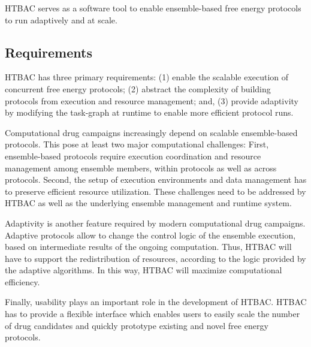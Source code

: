 HTBAC serves as a software tool to enable ensemble-based free energy
protocols to run adaptively and at scale.





\subsection{Requirements}

HTBAC has three primary requirements: (1) enable the scalable execution of
concurrent free energy protocols; (2) abstract the complexity of building
protocols from execution and resource management; and, (3) provide adaptivity
by modifying the task-graph at runtime to enable more efficient protocol
runs.

Computational drug campaigns increasingly depend on scalable ensemble-based
protocols. This pose at least two major computational challenges: First,
ensemble-based protocols require execution coordination and resource
management among ensemble members, within protocols as well as across
protocols. Second, the setup of execution environments and data management
has to preserve efficient resource utilization. These challenges need to be
addressed by HTBAC as well as the underlying ensemble management and runtime
system.

Adaptivity is another feature required by modern computational drug
campaigns. Adaptive protocols allow to change the control logic of the
ensemble execution, based on intermediate results of the ongoing computation.
Thus, HTBAC will have to support the redistribution of resources, according
to the logic provided by the adaptive algorithms. In this way, HTBAC will
maximize computational efficiency.

Finally, usability plays an important role in the development of HTBAC. HTBAC
has to provide a flexible interface which enables users to easily scale the
number of drug candidates and quickly prototype existing and novel free
energy protocols.

